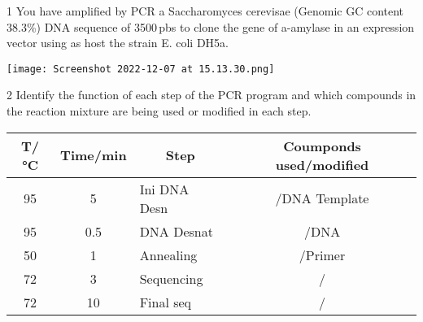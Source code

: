 \documentclass[\mainfilename]{subfiles}
\begin{document}
\begin{questionBox}1{ %
    You have amplified by PCR a Saccharomyces cerevisae (Genomic GC content 38.3\%) DNA sequence of 3500\,pbs to clone the gene of a-amylase in an expression vector using as host the strain E. coli DH5a.
} %

    \begin{center}
        \texttt{[image: Screenshot 2022-12-07 at 15.13.30.png]}
    \end{center}

\end{questionBox}

\begin{questionBox}2{ %
    Identify the function of each step of the PCR program and which compounds in the reaction mixture are being used or modified in each step.
} %
    
    \begin{table}[H]\centering

        \setlength\tabcolsep{3mm}        %
        \renewcommand\arraystretch{1.25} %

        \begin{tabular}{cclc}
            
            \\\toprule
            
                \multicolumn{1}{c}{T/\si{\celsius}}
            &   \multicolumn{1}{c}{Time/\si{\minute}}
            &   \multicolumn{1}{c}{Step}
            &   \multicolumn{1}{c}{Coumponds used/modified}
            
            \\\midrule
            
                95 &   5 & Ini DNA Desn & /DNA Template
            \\  95 & 0.5 & DNA Desnat   & /DNA
            \\  50 &   1 & Annealing    & /Primer
            \\  72 &   3 & Sequencing   & /
            \\  72 &  10 & Final seq    & /
            
            \\\bottomrule
            
        \end{tabular}
    \end{table}

\end{questionBox}
\end{document}
